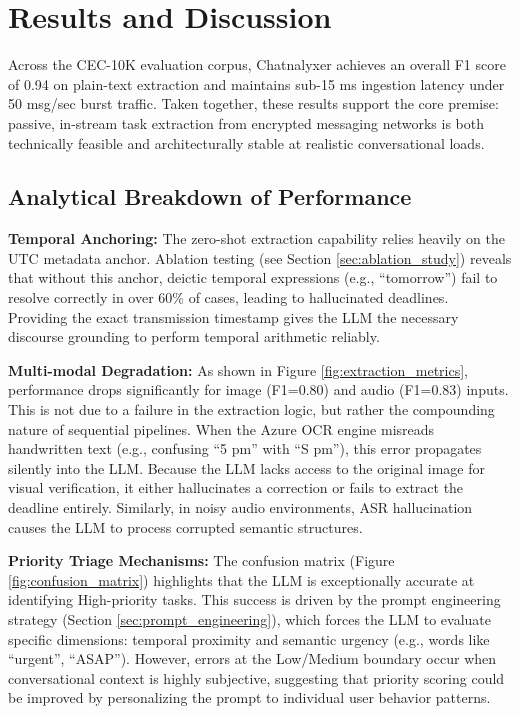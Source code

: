 \section{Results and Discussion}
\label{sec:results_discussion}

Across the CEC-10K evaluation corpus, Chatnalyxer achieves an overall F1 score of 0.94 on plain-text extraction and maintains sub-15 ms ingestion latency under 50 msg/sec burst traffic. Taken together, these results support the core premise: passive, in-stream task extraction from encrypted messaging networks is both technically feasible and architecturally stable at realistic conversational loads.

\subsection{Analytical Breakdown of Performance}

\textbf{Temporal Anchoring:} The zero-shot extraction capability relies heavily on the UTC metadata anchor. Ablation testing (see Section \ref{sec:ablation_study}) reveals that without this anchor, deictic temporal expressions (e.g., ``tomorrow'') fail to resolve correctly in over 60\% of cases, leading to hallucinated deadlines. Providing the exact transmission timestamp gives the LLM the necessary discourse grounding to perform temporal arithmetic reliably.

\textbf{Multi-modal Degradation:} As shown in Figure \ref{fig:extraction_metrics}, performance drops significantly for image (F1=0.80) and audio (F1=0.83) inputs. This is not due to a failure in the extraction logic, but rather the compounding nature of sequential pipelines. When the Azure OCR engine misreads handwritten text (e.g., confusing ``5 pm'' with ``S pm''), this error propagates silently into the LLM. Because the LLM lacks access to the original image for visual verification, it either hallucinates a correction or fails to extract the deadline entirely. Similarly, in noisy audio environments, ASR hallucination causes the LLM to process corrupted semantic structures. 

\textbf{Priority Triage Mechanisms:} The confusion matrix (Figure \ref{fig:confusion_matrix}) highlights that the LLM is exceptionally accurate at identifying High-priority tasks. This success is driven by the prompt engineering strategy (Section \ref{sec:prompt_engineering}), which forces the LLM to evaluate specific dimensions: temporal proximity and semantic urgency (e.g., words like ``urgent'', ``ASAP''). However, errors at the Low/Medium boundary occur when conversational context is highly subjective, suggesting that priority scoring could be improved by personalizing the prompt to individual user behavior patterns.

